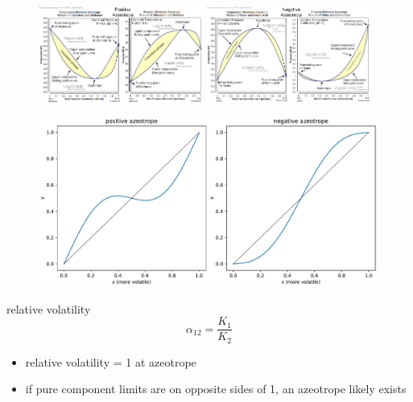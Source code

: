 \documentclass{article}
\begin{document}
\begin{figure}[H]
    \centering
    \includegraphics[width=0.48\textwidth, frame]{pos_azeo.png}
    \includegraphics[width=0.48\textwidth, frame]{neg_azeo.png}
\end{figure}
\begin{minipage}[t]{0.55\textwidth}
    \begin{figure}[H]
        \centering
        \includegraphics[width=0.99\textwidth]{xy_azeotropes.pdf}
    \end{figure}
\end{minipage}
\begin{minipage}[t]{0.37\textwidth}
    relative volatility
    \[\alpha_{12} = \frac{K_1}{K_2}\]
    \begin{itemize}
        \item relative volatility = 1 at azeotrope
        \item if pure component limits are on opposite sides of 1, an azeotrope likely exists
    \end{itemize}
\end{minipage}
\end{document}

